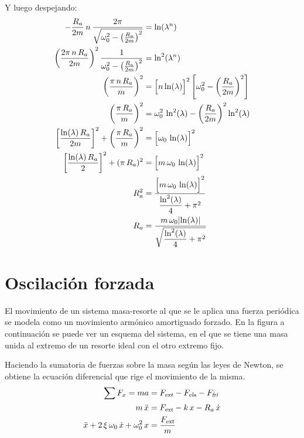 Y luego despejando:
\begin{align*}
    -\dfrac{R_a}{2m} \, n \, \dfrac{2 \pi}{\sqrt{\omega_0^2-\left(\frac{R_a}{2m}\right)^2}} &= \ln (\lambda^n)
    \\
    \left( \frac{2 \pi \, n \, R_a}{2m} \right)^2 \frac{1}{\omega_0^2-\left(\frac{R_a}{2m}\right)^2} &= \ln^2 (\lambda^n)
    \\
    \left( \frac{\pi \, n \, R_a}{m} \right)^2 &= \Big[ n \ln(\lambda) \Big]^2 \left[ \omega_0^2 - \left( \frac{R_a}{2m} \right)^2 \right]
    \\
    \left( \frac{\pi \, R_a}{m} \right)^2 &= \omega_0^2 \, \ln^2 (\lambda) - \left( \frac{R_a}{2m} \right)^2 \ln^2 (\lambda)
    \\
    \left[ \frac{\ln (\lambda) \, R_a}{2m} \right]^2 + \left( \frac{\pi \, R_a}{m} \right)^2 &= \Big[ \omega_0 \, \ln (\lambda) \Big]^2
    \\
    \left[ \frac{\ln (\lambda) \, R_a}{2} \right]^2 + (\pi \, R_a)^2 &= \Big[ m \, \omega_0 \, \ln (\lambda) \Big]^2
    \\
    R_a^2 &= \frac{\Big[ m \, \omega_0 \, \ln (\lambda) \Big]^2}{\dfrac{\ln^2(\lambda)}{4}+\pi^2}
    \\
    R_a &= \frac{m \, \omega_0 {\left| {\ln (\lambda)} \right|}}{\sqrt{\dfrac{\ln^2(\lambda)}{4}+\pi^2}}
\end{align*}


\section{Oscilación forzada}
\label{sec:oscilacionForzada}

El movimiento de un sistema masa-resorte al que se le aplica una fuerza periódica se modela como un movimiento armónico amortiguado forzado.
En la figura a continuación se puede ver un esquema del sistema, en el que se tiene una masa unida al extremo de un resorte ideal con el otro extremo fijo.

\begin{center}
    \def\svgwidth{0.5\linewidth}
    
\end{center}

Haciendo la sumatoria de fuerzas sobre la masa según las leyes de Newton, se obtiene la ecuación diferencial que rige el movimiento de la misma.
\begin{align*}
    \sum F_x = m a &= {{F}_\textsl{{ext}}} - {{F}_\textsl{{ela}}} - {{F}_\textsl{{fri}}}
    \\
    m \, \ddot{x} &= {{F}_\textsl{{ext}}} - k \, x - R_a \, \dot{x}
    \\
    \ddot{x} + 2 \, \xi \, \omega_0 \, \dot{x} + \omega_0^2 \, x &= \frac{{{F}_\textsl{{ext}}}}{m}
\end{align*}

